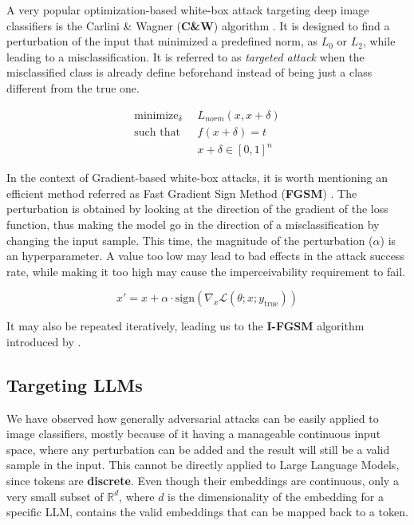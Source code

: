 \documentclass[../thesis.tex]{subfiles}
\begin{document}
A very popular optimization-based white-box attack targeting deep image classifiers is the Carlini \& Wagner (\textbf{C\&W}) algorithm \citep{carlini-wagner-image-attack}.
It is designed to find a perturbation of the input that minimized a predefined norm, as $L_0$ or $L_2$, while leading to a misclassification. It is referred to as \emph{targeted attack} when the misclassified class is already define beforehand instead of being just a class different from the true one.

\begin{equation}
\begin{split}
    \text{minimize}_\delta \;&\; L_{norm}(x, x+\delta) \\
    \text{such that}       \;&\; f(x+\delta) = t       \\
                           \;&\; x+\delta \in [0,1]^n
\end{split}
\end{equation}

In the context of Gradient-based white-box attacks, it is worth mentioning an efficient method referred as Fast Gradient Sign Method (\textbf{FGSM}) \citep{goodfellow2014explainingfgsm}.
The perturbation is obtained by looking at the direction of the gradient of the loss function, thus making the model go in the direction of a misclassification by changing the input sample.
This time, the magnitude of the perturbation ($\alpha$) is an hyperparameter. A value too low may lead to bad effects in the attack success rate, while making it too high may cause the imperceivability requirement to fail.

\begin{equation}
    x' = x + \alpha \cdot \text{sign}(\nabla_x \mathcal{L}(\theta; x; y_{\text{true}}))
\end{equation}

It may also be repeated iteratively, leading us to the \textbf{I-FGSM} algorithm introduced by \citeauthor{kurakin2018adversarial-iterative-fgsm}.

\subsection{Targeting LLMs}
\label{sec:introduction__meaning_attack_llm}
We have observed how generally adversarial attacks can be easily applied to image classifiers, mostly because of it having a manageable continuous input space, where any perturbation can be added and the result will still be a valid sample in the input.
This cannot be directly applied to Large Language Models, since tokens are \textbf{discrete}.
Even though their embeddings are continuous, only a very small subset of $\mathbb{R}^d$, where $d$ is the dimensionality of the embedding for a specific LLM, contains the valid embeddings that can be mapped back to a token.
\end{document}
